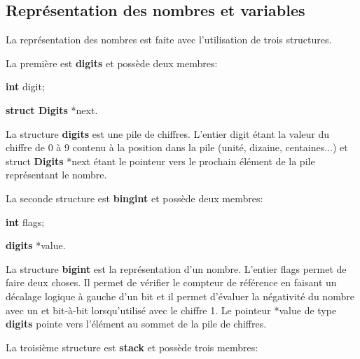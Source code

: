 \documentclass[]{report}
\begin{document}
	\begin{normalsize}
		\section*{\LARGE Représentation des nombres et variables}\vspace{4mm}
		La représentation des nombres est faite avec l'utilisation de trois structures.\vspace{4mm}
		\par La première est \textbf{digits} et possède deux membres: 
		\begin{description}[noitemsep]
			\item \hspace{4mm}\textbf{int} digit;
			\item \hspace{4mm}\textbf{struct Digits} *next.
		\end{description}
	\par La structure \textbf{digits} est une pile de chiffres. L'entier digit étant la valeur du chiffre de 0 à 9 contenu à la position dans la pile (unité, dizaine, centaines...) et struct \textbf{Digits} *next étant le pointeur vers le prochain élément de la pile représentant le nombre.\vspace{4mm}
	
	\par La seconde structure est \textbf{bingint} et possède deux membres:
		
		\begin{description}[noitemsep]
			\item \hspace{4mm}\textbf{int} flags;
			\item \hspace{4mm}\textbf{digits} *value.
		\end{description}
		\par La structure \textbf{bigint} est la représentation d'un nombre. L'entier flags permet de faire deux choses. Il permet de vérifier le compteur de référence en faisant un décalage logique à gauche d'un bit et il permet d'évaluer la négativité du nombre avec un et bit-à-bit lorsqu'utilisé avec le chiffre 1. Le pointeur *value de type \textbf{digits} pointe vers l'élément au sommet de la pile de chiffres.\vspace{4mm}
	
	\par La troisième structure est \textbf{stack} et possède trois membres:
	

\end{normalsize}
\end{document}

